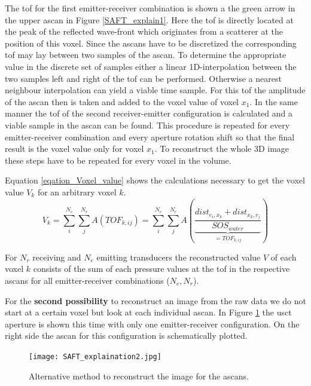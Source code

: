 The \ac{tof} for the first emitter-receiver combination is shown a the green arrow in the upper \ac{ascan} in Figure \ref{SAFT_explain1}. Here the \ac{tof} is directly located at the peak of the reflected wave-front which originates from a scatterer at the position of this voxel. Since the \acp{ascan} have to be discretized the corresponding \ac{tof} may lay between two samples of the \ac{ascan}. To determine the appropriate value in the discrete set of samples either a linear 1D-interpolation between the two samples left and right of the \ac{tof} can be performed. Otherwise a nearest neighbour interpolation can yield a viable time sample.
For this \ac{tof} the amplitude of the \ac{ascan} then is taken and added to the voxel value of voxel $x_1$. 
In the same manner the \ac{tof} of the second receiver-emitter configuration is calculated and a viable sample in the \ac{ascan} can be found.
This procedure is repeated for every emitter-receiver combination and every aperture rotation shift so that the final result is the voxel value only for voxel $x_1$.
To reconstruct the whole 3D image these steps have to be repeated for every voxel in the volume.

Equation \ref{eqation_Voxel_value} shows the calculations necessary to get the voxel value $V_k$ for an arbitrary voxel $k$. 
\begin{equation}
V_k = \sum_{i}^{N_e}\sum_{j}^{N_r} A(TOF_{k,ij}) = \sum_{i}^{N_e}\sum_{j}^{N_r} A \left (\underset{ = TOF_{k,ij} } {\underbrace{\frac{ dist_{e_i,x_k} + dist_{x_k,r_{j}}}{SOS_{water}} }}  \right )
\label{eqation_Voxel_value}
\end{equation}

For ${N_r}$ receiving and ${N_e}$ emitting transducers the reconstructed value $V$ of each voxel $k$ consists of the sum of each pressure values at the \ac{tof} in the respective \acp{ascan} for all emitter-receiver combinations ($N_e, N_r$). 

\bigskip
\bigskip

For the \textbf{second possibility} to reconstruct an image from the raw data we do not start at a certain voxel but look at each individual \ac{ascan}. In Figure \ref{SAFT_explain2} the \ac{usct} aperture is shown this time with only one emitter-receiver configuration. On the right side the \ac{ascan} for this configuration is schematically plotted.

\begin{figure}[H]
    \centering
    \texttt{[image: SAFT\_explaination2.jpg]}
    \caption{ Alternative method to reconstruct the image for the \acp{ascan}. }
    \label{SAFT_explain2}
\end{figure}


